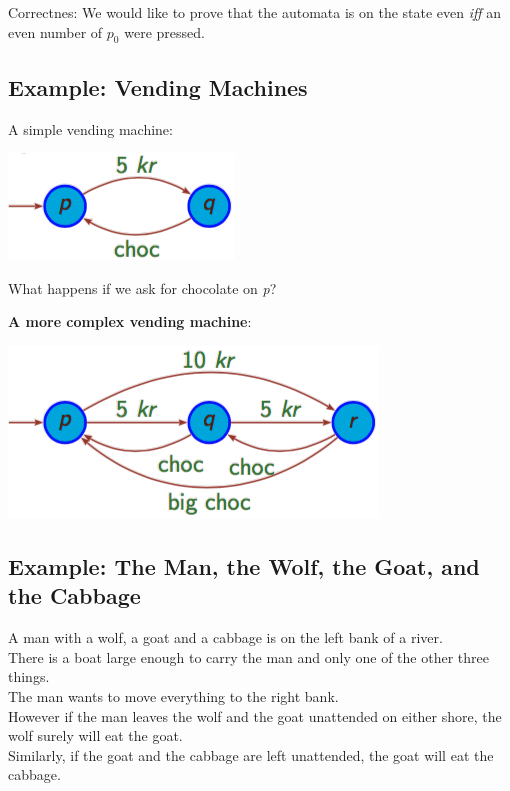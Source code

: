 \noindent
{\color{magenta} Correctnes:} We would like to prove that the automata is on
the state even \emph{iff} an even number of $p_0$ were pressed.

\subsection{Example: Vending Machines}
\label{sub:Example: Vending Machines}
A simple vending machine:
\begin{center}
	\includegraphics[scale=0.5]{vendingMachine.png}
\end{center}
What happens if we ask for chocolate on \emph{p}?\\
\smallskip

\noindent
\textbf{A more complex vending machine}:
\begin{center}
	\includegraphics[scale=0.5]{complexVendingMachine.png}
\end{center}

\subsection{Example: The Man, the Wolf, the Goat, and the Cabbage}
\label{sub:Example: The Man, the Wolf, the Goat, and the Cabbage}
A man with a wolf, a goat and a cabbage is on the left bank of a river.\\
There is a boat large enough to carry the man and only one of the other
three things.\\
The man wants to move everything to the right bank.\\
However if the man leaves the wolf and the goat unattended on either
shore, the wolf surely will eat the goat.\\
Similarly, if the goat and the cabbage are left unattended,
the goat will eat the cabbage.\\
\smallskip


